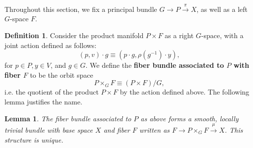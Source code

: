 \documentclass{book}
\theoremstyle{plain}
\newtheorem{lem}[thm]{Lemma}
\theoremstyle{definition}
\newtheorem{defn}{Definition}
\theoremstyle{remark}
\begin{document}
Throughout this section, we fix a principal bundle $G\to P\xrightarrow{\pi}X$, as well as a 
left $G$-space $F$. 

\begin{defn}
Consider the product manifold $P\times F$ as a right $G$-space, with a joint action defined as follows:
\[(p,v)\cdot g\equiv(p\cdot g, \rho(g^{-1})\cdot y),\]
for $p\in P,y\in V$, and $g\in G$. We define the \textbf{fiber bundle associated to $P$ with fiber $F$} to be the orbit space
\[P\times_G F\equiv (P\times F)/G,\]
i.e. the quotient of the product $P\times F$ by the action defined above. The following lemma
justifies the name.
\end{defn}

\begin{lem}
    The fiber bundle associated to $P$ as above forms a smooth, locally trivial bundle with base space $X$ and fiber $F$
    written as $F\to P\times_GF\xrightarrow{\mu}X$. This structure is unique.
\end{lem}
\end{document}
